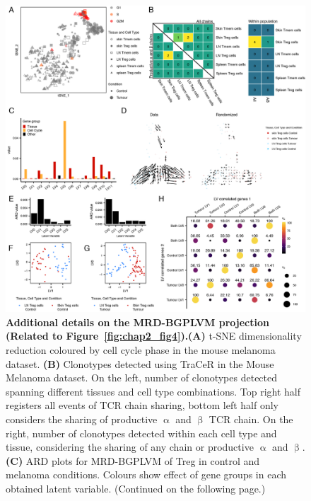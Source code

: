 \begin{figure}[pt!] 
\centering    
\includegraphics[width=1.0\textwidth]{Appendix1/Figs/appA_fig5.png} %
\caption[Additional details on the MRD-BGPLVM projection]{\textbf{Additional details on the MRD-BGPLVM projection (Related to Figure~\ref{fig:chap2_fig4}).}\newline\textbf{(A)} t-SNE dimensionality reduction coloured by cell cycle phase in the mouse melanoma dataset. \textbf{(B)} Clonotypes detected using TraCeR in the Mouse Melanoma dataset. On the left, number of clonotypes detected spanning different tissues and cell type combinations. Top right half registers all events of TCR chain sharing, bottom left half only considers the sharing of productive ${\upalpha}$ and ${\upbeta}$ TCR chain. On the right, number of clonotypes detected within each cell type and tissue, considering the sharing of any chain or productive ${\upalpha}$ and ${\upbeta}$. \textbf{(C)} ARD plots for MRD-BGPLVM of Treg in control and melanoma conditions. Colours show effect of gene groups in each obtained latent variable. (Continued on the following page.)}
\label{fig:appA_fig5}
\end{figure}
